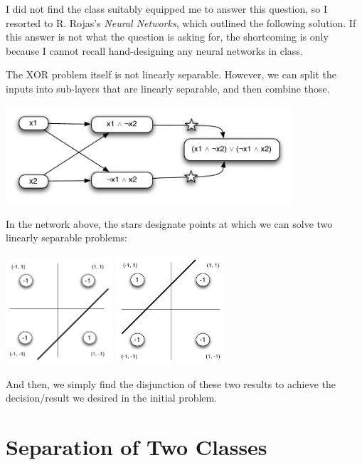 \documentclass[11pt]{report}
\begin{document}
I did not find the class suitably equipped me to answer this question, so I resorted to R. Rojas's \emph{Neural Networks}, which outlined the following solution. If this answer is not what the question is asking for, the shortcoming is only because I cannot recall hand-designing any neural networks in class.

The XOR problem itself is not linearly separable. However, we can split the inputs into sub-layers that are linearly separable, and then combine those.

\begin{center}
  \includegraphics[width=0.8\textwidth]{xor.pdf}
\end{center}
In the network above, the stars designate points at which we can solve two linearly separable problems:

\hfil
\includegraphics[width=0.3\textwidth]{xor-1st.pdf}
\hfil
\includegraphics[width=0.3\textwidth]{xor-2nd.pdf}
\hfil

\medskip\noindent
And then, we simply find the disjunction of these two results to achieve the decision/result we desired in the initial problem.

\section{Separation of Two Classes}
\end{document}
